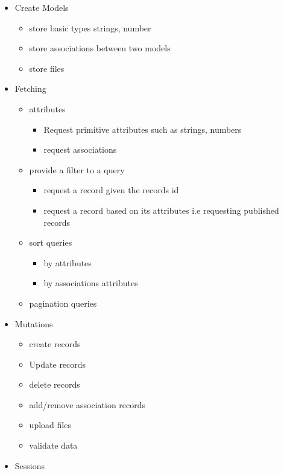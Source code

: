 \documentclass[
  12pt,
]{article}
\providecommand{\tightlist}{%
  \setlength{\itemsep}{0pt}\setlength{\parskip}{0pt}}
\begin{document}
\begin{itemize}
\item
  Create Models

  \begin{itemize}
  \tightlist
  \item
    store basic types strings, number
  \item
    store associations between two models
  \item
    store files
  \end{itemize}
\item
  Fetching

  \begin{itemize}
  \tightlist
  \item
    attributes

    \begin{itemize}
    \tightlist
    \item
      Request primitive attributes such as strings, numbers
    \item
      request associations
    \end{itemize}
  \item
    provide a filter to a query

    \begin{itemize}
    \tightlist
    \item
      request a record given the records id
    \item
      request a record based on its attributes i.e requesting published
      records
    \end{itemize}
  \item
    sort queries

    \begin{itemize}
    \tightlist
    \item
      by attributes
    \item
      by associations attributes
    \end{itemize}
  \item
    pagination queries
  \end{itemize}
\item
  Mutations

  \begin{itemize}
  \tightlist
  \item
    create records
  \item
    Update records
  \item
    delete records
  \item
    add/remove association records
  \item
    upload files
  \item
    validate data
  \end{itemize}
\item
  Sessions


\end{itemize}
\end{document}

